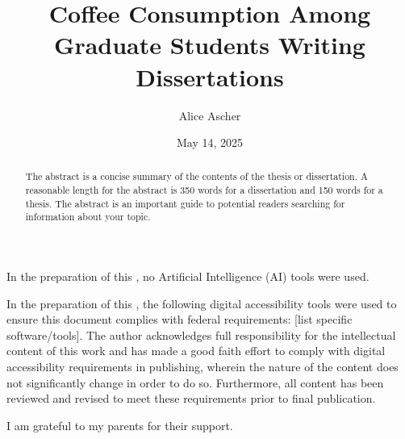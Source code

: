 \documentclass{authesis}
\title{Coffee Consumption Among Graduate Students Writing Dissertations}
\author{Alice Ascher}
\date{May 14, 2025}
\begin{document}
\begin{frontmatter}
\maketitle

\begin{abstract}
The abstract is a concise summary of the contents of the thesis or dissertation.
A reasonable length for the abstract is 350 words for a dissertation and 150 words
for a thesis. The abstract is an important guide to potential readers searching for
information about your topic.
\end{abstract}

\begin{aidisclosure}
%
In the preparation of this {\thesistype}, no Artificial Intelligence (AI) tools were used.
\end{aidisclosure}

\begin{accessibilitydisclosure}
In the preparation of this {\thesistype}, the following digital
accessibility tools were used to ensure this document complies with federal
requirements: [list specific software/tools]. The author acknowledges full responsibility
for the intellectual content of this work and has made a good faith effort to comply with
digital accessibility requirements in publishing, wherein the nature of the content does
not significantly change in order to do so. Furthermore, all content has been reviewed
and revised to meet these requirements prior to final publication.
\end{accessibilitydisclosure}

\begin{acknowledgements}
I am grateful to my parents for their support.
\end{acknowledgements}

\tableofcontents

\listoftables

\listoffigures
\end{frontmatter}






\printbibliography[heading=bibintoc,title={References}]

\appendix


\end{document}
